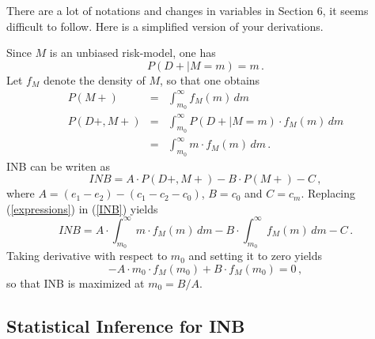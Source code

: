 \documentclass[11pt]{article}
\begin{document}
There are a lot of notations and changes in variables in Section 6, it seems difficult to follow. Here is a simplified version of your derivations.

Since $M$ is an unbiased risk-model, one has 
\begin{equation}\label{risk_model}
P(D+|M=m) = m  \,.
\end{equation}
Let $f_M$ denote the density of $M$, so that one obtains
\begin{eqnarray} \nonumber
P(M+) &=& \int_{m_0}^\infty f_M(m)\,dm\\  \label{expressions}
P(D+,M+) &=& \int_{m_0}^\infty P(D+|M=m)\cdot f_M(m)\,dm\\   \nonumber
         &=& \int_{m_0}^\infty m\cdot f_M(m)\,dm\,.
\end{eqnarray}
INB can be writen as 
\begin{equation}\label{INB}
INB = A\cdot P(D+,M+) - B\cdot P(M+) -C\,, 
\end{equation}
where $A=(e_1-e_2) - (c_1-c_2-c_0)$, $B=c_0$ and $C=c_m$.
Replacing (\ref{expressions}) in (\ref{INB}) yields
\begin{equation}\label{INB2}
INB=A\cdot \int_{m_0}^\infty m\cdot f_M(m)\,dm - B\cdot \int_{m_0}^\infty f_M(m)\,dm - C\,.
\end{equation}
Taking derivative with respect to $m_0$ and setting it to zero yields
\[-A\cdot m_0\cdot f_M(m_0) + B\cdot f_M(m_0) =0\,, \]
so that INB is maximized at $m_0=B/A$. 

\subsection{Statistical Inference for INB}
\end{document}
